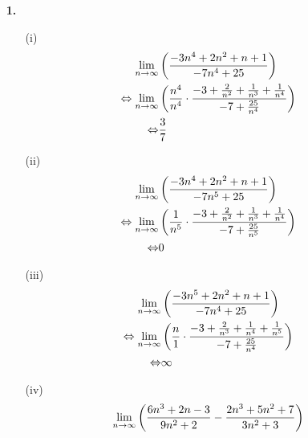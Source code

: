 \documentclass [a4paper,11pt]{article}
\author{\authorinfotitle}
\title{\titleinfo}
\date{\today}
\begin{document}
\maketitle
    \begin{enumerate}
        \item[\textbf{1.}]
            \begin{enumerate}
                \item[(i)]
                    \begin{align}
                        \underset{n \to \infty}{\lim}
                        &\left( \frac{-3n^4+2n^2+n+1}{-7n^4+25} \right) \\
                        \Leftrightarrow \underset{n \to \infty}{\lim}
                        &\left( \frac{n^4}{n^4} \cdot \frac{-3+ \frac{2}{n^2} + \frac{1}{n^3} + \frac{1}{n^4}}{-7+ \frac{25}{n^4}} \right) \\
                        \Leftrightarrow &\frac{3}{7}
                    \end{align}
                \item[(ii)]
                    \begin{align}
                        \limp
                        &\left( \frac{-3n^4+2n^2+n+1}{-7n^5+25} \right) \\
                        \Leftrightarrow \limp
                        &\left( \frac{1}{n^5} \cdot \frac{-3+ \frac{2}{n^2} + \frac{1}{n^3} + \frac{1}{n^4}}{-7+ \frac{25}{n^5}} \right) \\
                        \Leftrightarrow &0 %
                    \end{align}
                \item[(iii)]
                    \begin{align}
                        \underset{n \to \infty}{\lim}
                        &\left( \frac{-3n^5+2n^2+n+1}{-7n^4+25} \right) \\
                        \Leftrightarrow \underset{n \to \infty}{\lim}
                        &\left( \frac{n}{1} \cdot \frac{-3+ \frac{2}{n^3} + \frac{1}{n^4} + \frac{1}{n^5}}{-7+ \frac{25}{n^4}} \right) \\
                        \Leftrightarrow &\infty
                    \end{align}
                \item[(iv)]
                    \begin{align}
                        \limp
                        &\left( \frac{6n^3+2n-3}{9n^2+2} - \frac{2n^3+5n^2+7}{3n^2+3} \right) \\

\end{align}
\end{enumerate}
\end{enumerate}
\end{document}
